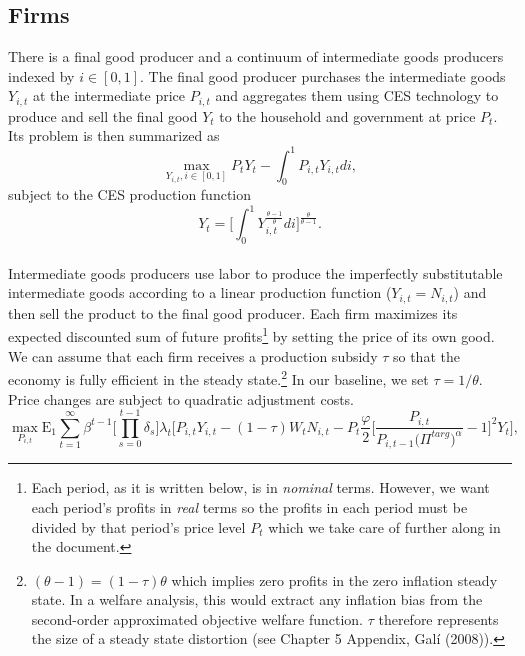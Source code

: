 \documentclass[11pt]{article}
\begin{document}
\begin{singlespace}
		\subsection{Firms}

		\normalsize{There is a final good producer and a continuum of intermediate goods producers indexed by \(i \in [0,1]\). The final good producer purchases the intermediate goods \(Y_{i,t}\) at the intermediate price \(P_{i,t}\) and aggregates them using CES technology to produce and sell the final good \(Y_{t}\) to the household and government at price \(P_{t}\). Its problem is then summarized as}
		\begin{equation}
			\max\limits_{Y_{i,t},i \in [0,1]} P_{t}Y_{t} - \int\nolimits^{1}_{0} P_{i,t}Y_{i,t}di,
		\end{equation}
		\normalsize{subject to the CES production function}
		\begin{equation}
			Y_{t} = \Bigg[\int\nolimits_{0}^{1}Y_{i,t}^{\frac{\theta-1}{\theta}}di\Bigg]^{\frac{\theta}{\theta-1}}.
		\end{equation}\\
		\normalsize{Intermediate goods producers use labor to produce the imperfectly substitutable intermediate goods according to a linear production function (\(Y_{i,t}=N_{i,t}\)) and then sell the product to the final good producer. Each firm maximizes its expected discounted sum of future profits\footnote{Each period, as it is written below, is in \textit{nominal} terms. However, we want each period's profits in \textit{real} terms so the profits in each period must be divided by that period's price level \(P_{t}\) which we take care of further along in the document.} by setting the price of its own good. We can assume that each firm receives a production subsidy \(\tau\) so that the economy is fully efficient in the steady state.\footnote{\((\theta-1)=(1-\tau)\theta\) which implies zero profits in the zero inflation steady state. In a welfare analysis, this would extract any inflation bias from the second-order approximated objective welfare function. \(\tau\) therefore represents the size of a steady state distortion (see Chapter 5 Appendix, Gal\'{i} (2008)).} In our baseline, we set $\tau = 1/\theta$. Price changes are subject to quadratic adjustment costs. }\\
		\begin{equation}
			\max\limits_{P_{i,t}} \mathrm{E_{1}}\sum\limits_{t=1}^{\infty}\beta^{t-1}\Bigg[\prod\limits_{s=0}^{t-1}\delta_{s}\Bigg]\lambda_{t}\Bigg[P_{i,t}Y_{i,t}-( 1-\tau )W_{t}N_{i,t}-P_{t}\frac{\varphi}{2}\Big[\frac{P_{i,t}}{P_{i,t-1}\bigl(\Pi^{targ}\bigr)^{\alpha}}-1\Big]^{2}Y_{t}\Bigg],

\end{equation}
\end{singlespace}
\end{document}
